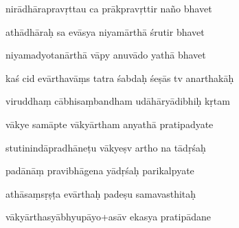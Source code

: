 \documentclass[article,12pt,a4paper]{memoir}%
\newcounter{parCount}
\begin{document}
	  
	  \pstart {} nirādhārapravṛttau ca prākpravṛttir naño bhavet 
	{}
	\pend%
      

	  
	  \pstart \leavevmode%
	athādhāraḥ sa evāsya niyamārthā śrutir bhavet 
	{}
	\pend%
      

	  
	  \pstart {} niyamadyotanārthā vāpy anuvādo yathā bhavet 
	{}
	\pend%
      

	  
	  \pstart \leavevmode%
	kaś cid evārthavāṃs tatra śabdaḥ śeṣās tv anarthakāḥ 
	{}
	\pend%
      

	  
	  \pstart {} viruddhaṃ cābhisaṃbandham udāhāryādibhiḥ kṛtam 
	{}
	\pend%
      

	  
	  \pstart \leavevmode%
	vākye samāpte vākyārtham anyathā pratipadyate 
	{}
	\pend%
      

	  
	  \pstart {} stutinindāpradhāneṭu vākyeṣv artho na tādṛśaḥ 
	{}
	\pend%
      

	  
	  \pstart \leavevmode%
	padānāṃ pravibhāgena yādṛśaḥ parikalpyate 
	{}
	\pend%
      

	  
	  \pstart {} athāsaṃsṛṣṭa evārthaḥ padeṣu samavasthitaḥ 
	{}
	\pend%
      

	  
	  \pstart \leavevmode%
	vākyārthasyābhyupāyo+asāv ekasya pratipādane 
	{}
	\pend%
      
\end{document}
